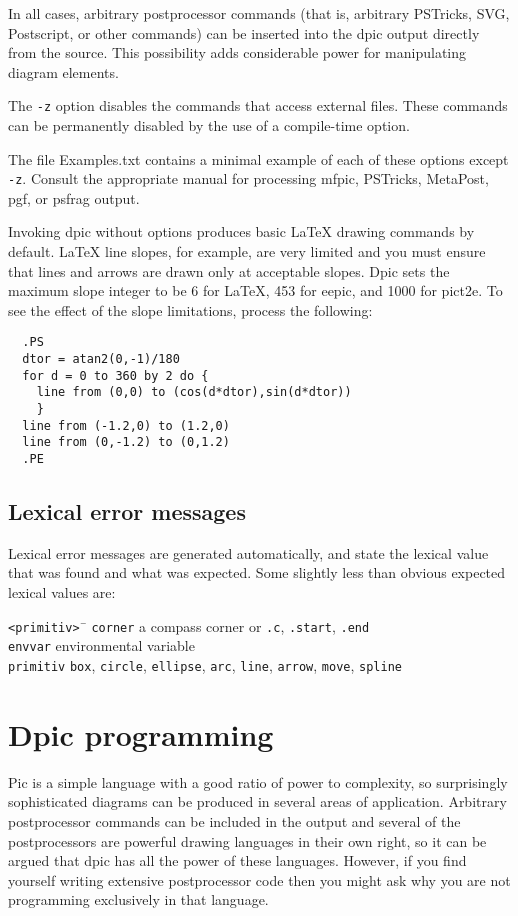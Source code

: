 \documentclass[11pt]{article}
\newcommand{\bq}{}
\newcommand{\Dpic}{{\bq Dpic}\xspace}
\newcommand{\mfpic}{{\bq mfpic}\xspace}
\newcommand{\PSTricks}{{\bq PSTricks}\xspace}
\newcommand{\MetaPost}{{\bq MetaPost}\xspace}
\newcommand{\Postscript}{{\bq Postscript}\xspace}
\begin{document}
In all cases, arbitrary postprocessor commands (that is, arbitrary \PSTricks,
SVG, \Postscript, or other commands) can be inserted into the dpic output
directly from the source.
This possibility adds considerable power for manipulating diagram
elements.

The {\tt -z} option disables the commands that access external files.
These commands can be permanently disabled by the use of a compile-time
option.

The file Examples.txt contains a minimal example of each of these
options except {\tt -z}.  Consult the appropriate manual for processing
\mfpic, \PSTricks, \MetaPost, pgf, or psfrag output.

Invoking dpic without options produces basic LaTeX drawing commands
by default.  LaTeX line slopes, for example, are very limited and you
must ensure that lines and arrows are drawn only at acceptable slopes.
\Dpic sets the maximum slope integer to be 6 for LaTeX, 453 for eepic,
and 1000 for pict2e.  To see the effect of the slope limitations,
process the following:
\begin{verbatim}
  .PS
  dtor = atan2(0,-1)/180
  for d = 0 to 360 by 2 do {
    line from (0,0) to (cos(d*dtor),sin(d*dtor))
    }
  line from (-1.2,0) to (1.2,0)
  line from (0,-1.2) to (0,1.2)
  .PE
\end{verbatim}


\subsection{Lexical error messages}
  Lexical error messages are generated automatically, and state the
lexical value that was found and what was expected.  Some
slightly less than obvious expected lexical values are:

\begin{tabbing}
\quad\=\hbox{\tt<primitiv>\ }\= \kill
\> {\tt corner} \> a compass corner or {\tt.c}, {\tt .start}, {\tt .end} \\
\> {\tt envvar} \> environmental variable \\
\> {\tt primitiv} \> {\tt box}, {\tt circle}, {\tt ellipse}, {\tt arc},
   {\tt line}, {\tt arrow}, {\tt move}, {\tt spline}
\end{tabbing}

\section{Dpic programming}
Pic is a simple language with a good ratio of power to complexity, so
surprisingly sophisticated diagrams can be produced in several areas of
application.
Arbitrary postprocessor commands can be included in the output and several
of the postprocessors are powerful drawing languages in their own
right, so it can be argued that dpic has all the power of these languages.
However, if you find yourself writing extensive postprocessor code then
you might ask why you are not programming exclusively in that language.
\end{document}
